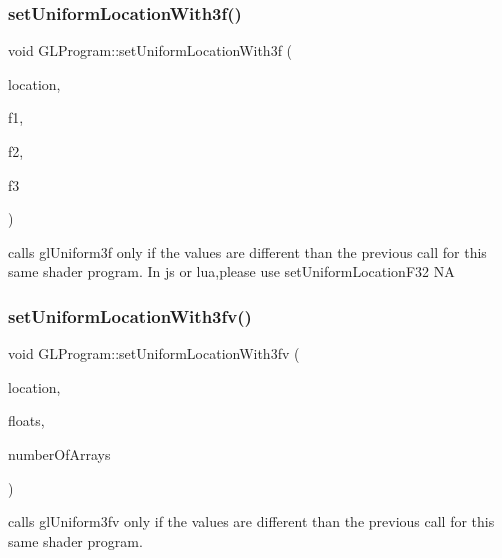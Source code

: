 \subsubsection{\texorpdfstring{set\+Uniform\+Location\+With3f()}{setUniformLocationWith3f()}\hspace{0.1cm}{\footnotesize\ttfamily [2/2]}}
{\footnotesize\ttfamily void G\+L\+Program\+::set\+Uniform\+Location\+With3f (\begin{DoxyParamCaption}\item[{G\+Lint}]{location,  }\item[{G\+Lfloat}]{f1,  }\item[{G\+Lfloat}]{f2,  }\item[{G\+Lfloat}]{f3 }\end{DoxyParamCaption})}

calls gl\+Uniform3f only if the values are different than the previous call for this same shader program. In js or lua,please use set\+Uniform\+Location\+F32  NA \mbox{\label{classGLProgram_a0df23e97019d9c292a8068bb448f05e3}} 
\subsubsection{\texorpdfstring{set\+Uniform\+Location\+With3fv()}{setUniformLocationWith3fv()}\hspace{0.1cm}{\footnotesize\ttfamily [1/2]}}
{\footnotesize\ttfamily void G\+L\+Program\+::set\+Uniform\+Location\+With3fv (\begin{DoxyParamCaption}\item[{G\+Lint}]{location,  }\item[{const G\+Lfloat $\ast$}]{floats,  }\item[{unsigned int}]{number\+Of\+Arrays }\end{DoxyParamCaption})}

calls gl\+Uniform3fv only if the values are different than the previous call for this same shader program. \mbox{\label{classGLProgram_a0df23e97019d9c292a8068bb448f05e3}} 
